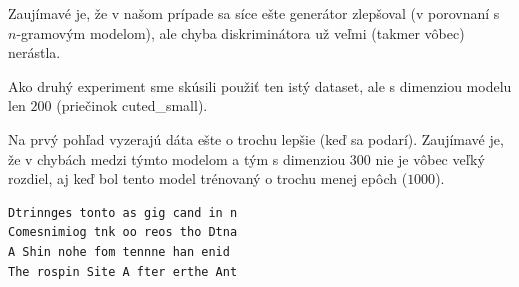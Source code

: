 \documentclass[10pt,a4paper]{article}
\begin{document}
Zaujímavé je, že v našom prípade sa síce ešte generátor zlepšoval (v porovnaní s $n$-gramovým modelom), ale chyba diskriminátora už veľmi (takmer vôbec) nerástla. 

Ako druhý experiment sme skúsili použiť ten istý dataset, ale s dimenziou modelu len $200$ (priečinok cuted\_small).

Na prvý pohľad vyzerajú dáta ešte o trochu lepšie (keď sa podarí). Zaujímavé je, že v chybách medzi týmto modelom a tým s dimenziou $300$ nie je vôbec veľký rozdiel, aj keď bol tento model trénovaný o trochu menej epôch ($1000$). 
\begin{verbatim}
Dtrinnges tonto as gig cand in n
Comesnimiog tnk oo reos tho Dtna
A Shin nohe fom tennne han enid 
The rospin Site A fter erthe Ant
\end{verbatim}
\end{document}
